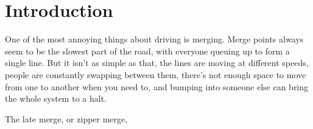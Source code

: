 \section{Introduction}

\par
One of the most annoying things about driving is merging. Merge points always seem to be the slowest part of the road, with everyone queuing up to form a single line. But it isn't as simple as that, the lines are moving at different speeds, people are constantly swapping between them, there's not enough space to move from one to another when you need to, and bumping into someone else can bring the whole system to a halt.

\par
The late merge, or zipper merge, 


